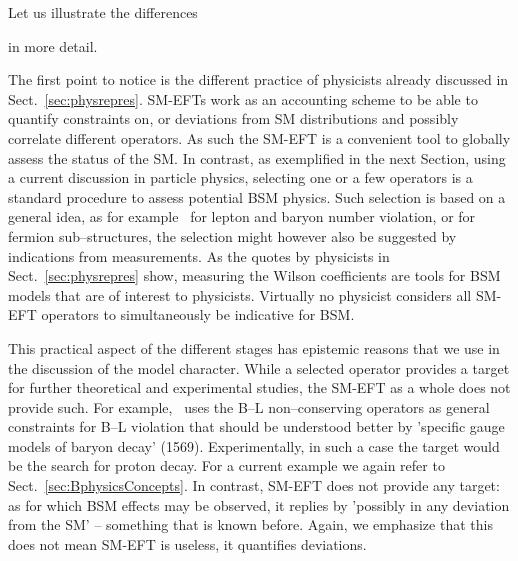 Let us illustrate the differences 
{ in more detail. 

The first point to notice is the different practice of physicists already discussed in
Sect.~\ref{sec:physrepres}.
SM-EFTs work as an accounting scheme to be able to quantify constraints on, or deviations
from SM distributions and possibly correlate different operators.
As such the SM-EFT is a convenient tool to globally assess the status of the SM.
In contrast, as exemplified in the next Section, using a current discussion in particle physics,
selecting one or a few operators is a standard procedure to assess potential BSM physics.
Such selection is based on a general idea, as for example~\cite{Weinberg:1979sa} for lepton
and baryon number violation, or \cite{Eichten:1983hw} for fermion sub--structures, the
selection might however also be suggested by indications from measurements. 
As the quotes by physicists in Sect.~\ref{sec:physrepres} show, measuring the Wilson coefficients
are tools for BSM models that are of interest to physicists.
Virtually no physicist considers all SM-EFT operators to simultaneously be indicative for BSM. 

This practical aspect of the different stages has epistemic reasons that we use in the discussion of
the model character.
While a selected operator provides a target for further theoretical and experimental studies,
the SM-EFT as a whole does not provide such.
For example,~\cite{Weinberg:1979sa} uses the B--L non--conserving operators as general
constraints for B--L violation that should be understood better by 'specific gauge models of
baryon decay' (1569).
Experimentally, in such a case the target would be the search for proton decay.
For a current example we again refer to Sect.~\ref{sec:BphysicsConcepts}.
In contrast, SM-EFT does not provide any target:
as for which BSM effects may be observed, it replies by 'possibly in any deviation from the SM'
-- something that is known before.
Again, we emphasize that this does not mean SM-EFT is useless, it quantifies deviations.

}
